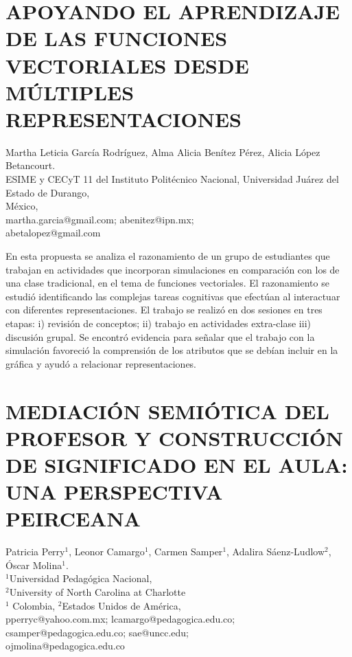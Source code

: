 \section{APOYANDO EL APRENDIZAJE DE LAS FUNCIONES VECTORIALES DESDE MÚLTIPLES
REPRESENTACIONES}

\begin{datos}
Martha Leticia García Rodríguez, Alma Alicia Benítez Pérez, Alicia López Betancourt.\\
ESIME y CECyT 11 del Instituto Politécnico Nacional, Universidad Juárez del Estado de Durango,\\
\hfill   México, \\
\hfill martha.garcia@gmail.com; abenitez@ipn.mx;\\\hfill abetalopez@gmail.com
\end{datos}

En esta propuesta se analiza el razonamiento de un grupo de estudiantes
que trabajan en actividades que incorporan simulaciones en comparación
con los de una clase tradicional, en el tema de funciones vectoriales.
El razonamiento se estudió identificando las complejas tareas cognitivas
que efectúan al interactuar con diferentes representaciones. El trabajo
se realizó en dos sesiones en tres etapas: i) revisión de conceptos;
ii) trabajo en actividades extra-clase iii) discusión grupal. Se encontró
evidencia para señalar que el trabajo con la simulación favoreció
la comprensión de los atributos que se debían incluir en la gráfica
y ayudó a relacionar representaciones.


\section{MEDIACIÓN SEMIÓTICA DEL PROFESOR Y CONSTRUCCIÓN DE SIGNIFICADO EN
EL AULA: UNA PERSPECTIVA PEIRCEANA}

\begin{datos}
Patricia Perry$^1$, Leonor Camargo$^1$, Carmen Samper$^1$, Adalira Sáenz-Ludlow$^2$, Óscar Molina$^1$.\\
$^1$Universidad Pedagógica Nacional, \\$^2$University of North Carolina at Charlotte\\
\hfill   $^1$ Colombia, $^2$Estados Unidos de América, \\
\hfill pperryc@yahoo.com.mx; lcamargo@pedagogica.edu.co;\\
\hfill csamper@pedagogica.edu.co; sae@uncc.edu;\\\hfill ojmolina@pedagogica.edu.co
\end{datos}

